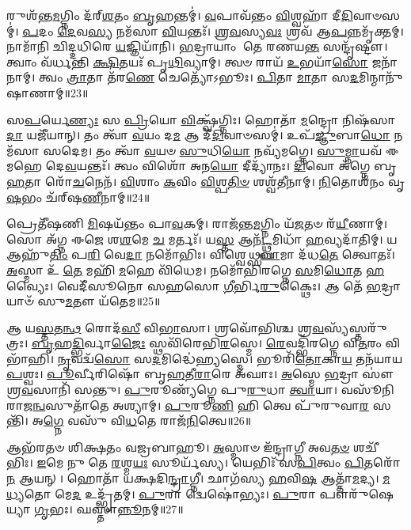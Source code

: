 𑌰𑍁𑌶᳴𑌨𑍍𑌤\-\ul{𑌮}\-𑌗𑍍𑌨𑌿𑌂 𑌦᳴𑌰𑍍‌\mbox{}\-\ul{𑌶}\-𑌤𑌂 \ul{𑌬𑍃}\-𑌹𑌨𑍍𑌤𑌮𑍍॑।
\-\ul{𑌵}\-𑌪𑌾𑌵᳴𑌨𑍍𑌤𑌂 \ul{𑌵𑌿}\-𑌶𑍍𑌵𑌹𑌾᳴ 𑌦𑍀\-\ul{𑌦𑌿}\-𑌵𑌾𑍞𑌸𑌮𑍍॑।
\-\ul{𑌪}\-𑌦𑌂 \ul{𑌦𑍇}\-𑌵\-\ul{𑌸𑍍𑌯} 𑌨𑌮᳴𑌸𑌾 \ul{𑌵𑌿}\-𑌯𑌨𑍍𑌤𑌃᳴।
\-\ul{𑌶𑍍𑌰}\-\-\ul{𑌵}\-𑌸𑍍𑌯\-\ul{𑌵𑌃} 𑌶𑍍𑌰𑌵᳴ 𑌆\-\ul{𑌪}\-𑌨𑍍𑌨𑌮𑍃᳴𑌕𑍍𑌤𑌮𑍍।
𑌨𑌾𑌮𑌾᳴𑌨𑌿 𑌚𑌿𑌦𑍍𑌦𑌧𑌿𑌰𑍇 \ul{𑌯}\-𑌜𑍍𑌞𑌿𑌯𑌾᳴𑌨𑌿।
\-\ul{𑌭}\-𑌦𑍍𑌰𑌾𑌯𑌾𑌂 𑌤𑍇 𑌰𑌣𑌯\-\ul{𑌨𑍍𑌤} 𑌸𑌨𑍍𑌦𑍃᳴𑌷𑍍𑌟𑍗।
𑌤𑍍𑌵𑌾𑌂 𑌵᳴𑌰𑍍𑌧𑌨𑍍𑌤𑌿 \ul{𑌕𑍍𑌷𑌿}\-𑌤𑌯𑌃᳴ 𑌪𑍃\-\ul{𑌥𑌿}\-𑌵𑍍𑌯𑌾𑌮𑍍।
𑌤𑍍𑌵𑍞 𑌰𑌾𑌯᳴ \ul{𑌉}\-𑌭𑌯𑌾᳴\-\ul{𑌸𑍋} 𑌜𑌨𑌾᳴𑌨𑌾𑌮𑍍।
𑌤𑍍𑌵𑌂 \ul{𑌤𑍍𑌰𑌾}\-𑌤𑌾 𑌤᳴𑌰\-\ul{𑌣𑍇} 𑌚𑍇𑌤𑍍𑌯𑍋᳴𑌽𑌭𑍂𑌃।
\-\ul{𑌪𑌿}\-𑌤𑌾 \ul{𑌮𑌾}\-𑌤𑌾 𑌸\-\ul{𑌦}\-𑌮𑌿𑌨𑍍𑌮𑌾𑌨𑍁᳴𑌷𑌾𑌣𑌾𑌮𑍍॥23॥

𑌸\-\ul{𑌪}\-𑌰𑍍𑌯𑍇\-\ul{𑌣𑍍𑌯𑌃} 𑌸 \ul{𑌪𑍍𑌰𑌿}\-𑌯𑍋 \ul{𑌵𑌿}\-𑌕𑍍𑌷𑍍𑌵᳴𑌗𑍍𑌨𑌿𑌃।
𑌹𑍋𑌤𑌾᳴ \ul{𑌮}\-𑌨𑍍𑌦𑍍𑌰𑍋 𑌨𑌿𑌷᳴𑌸𑌾\-\ul{𑌦𑌾} 𑌯𑌜𑍀᳴𑌯𑌾𑌨𑍍।
𑌤𑌂 𑌤𑍍𑌵𑌾᳴ \ul{𑌵}\-𑌯𑌂 𑌦\-\ul{𑌮} 𑌆 𑌦𑍀᳴\-\ul{𑌦𑌿}\-𑌵𑌾𑍞𑌸𑌮𑍍॑।
𑌉𑌪᳴\-\ul{𑌜𑍍𑌞𑍁}\-𑌬𑌾\-\ul{𑌧𑍋} 𑌨𑌮᳴𑌸𑌾 𑌸𑌦𑍇𑌮।
𑌤𑌂 𑌤𑍍𑌵𑌾᳴ \ul{𑌵}\-𑌯𑍞 \ul{𑌸𑍁}\-𑌧𑌿\-\ul{𑌯𑍋} 𑌨𑌵𑍍𑌯᳴𑌮𑌗𑍍𑌨𑍇।
\-\ul{𑌸𑍁}\-\-\ul{𑌮𑍍𑌨𑌾}\-𑌯𑌵᳴ 𑌈𑌮𑌹𑍇 𑌦𑍇\-\ul{𑌵}\-𑌯𑌨𑍍𑌤𑌃᳴।
𑌤𑍍𑌵𑌂 𑌵𑌿𑌶𑍋᳴ 𑌅𑌨\-\ul{𑌯𑍋} 𑌦𑍀𑌦𑍍𑌯𑌾᳴𑌨𑌃।
\-\ul{𑌦𑌿}\-𑌵𑍋 𑌅᳴𑌗𑍍𑌨𑍇 𑌬𑍃\-\ul{𑌹}\-𑌤𑌾 𑌰𑍋᳴\-\ul{𑌚}\-𑌨𑍇𑌨᳴।
\-\ul{𑌵𑌿}\-𑌶𑌾𑌂 \ul{𑌕}\-𑌵𑌿𑌂 \ul{𑌵𑌿}\-𑌶𑍍𑌪\-\ul{𑌤𑌿}\-\-\ul{𑍞} 𑌶𑌶𑍍𑌵᳴𑌤𑍀𑌨𑌾𑌮𑍍।
\-\ul{𑌨𑌿}\-𑌤𑍋𑌶᳴𑌨𑌂 𑌵𑍃\-\ul{𑌷}\-𑌭𑌂 𑌚᳴𑌰𑍍‌\mbox{}𑌷\-\ul{𑌣𑍀}\-𑌨𑌾𑌮𑍍॥24॥

𑌪𑍍𑌰𑍇𑌤𑍀᳴𑌷𑌣𑌿 \ul{𑌮𑌿}\-𑌷𑌯᳴𑌨𑍍𑌤𑌂 𑌪𑌾\-\ul{𑌵}\-𑌕𑌮𑍍।
𑌰𑌾𑌜᳴𑌨𑍍𑌤\-\ul{𑌮}\-𑌗𑍍𑌨𑌿𑌂 𑌯᳴\-\ul{𑌜}\-𑌤𑍞 𑌰᳴\-\ul{𑌯𑍀}\-𑌣𑌾𑌮𑍍।
𑌸𑍋 𑌅᳴𑌗𑍍𑌨 𑌈𑌜𑍇 𑌶\-\ul{𑌶}\-𑌮𑍇 \ul{𑌚} 𑌮𑌰𑍍𑌤𑌃᳴।
𑌯\-\ul{𑌸𑍍𑌤} 𑌆𑌨᳴\-\ul{𑌟𑍍𑌥𑍍𑌸}\-𑌮𑌿𑌧𑌾᳴ \ul{𑌹}\-𑌵𑍍𑌯𑌦𑌾᳴𑌤𑌿𑌮𑍍।
𑌯 𑌆𑌹𑍁᳴\-\ul{𑌤𑌿𑌂} 𑌪\-\ul{𑌰𑌿} 𑌵𑍇\-\ul{𑌦𑌾} 𑌨𑌮𑍋᳴𑌭𑌿𑌃।
𑌵𑌿𑌶𑍍𑌵𑍇𑌥𑍍𑌸\-\ul{𑌵𑌾}\-𑌮𑌾 𑌦᳴𑌧\-\ul{𑌤𑍇} 𑌤𑍍𑌵𑍋𑌤𑌃᳴।
\-\ul{𑌅}\-𑌸𑍍𑌮𑌾 𑌉᳴ \ul{𑌤𑍇} 𑌮𑌹𑌿᳴ \ul{𑌮}\-𑌹𑍇 𑌵𑌿᳴𑌧𑍇𑌮।
𑌨𑌮𑍋᳴𑌭𑌿𑌰𑌗𑍍𑌨𑍇 \ul{𑌸}\-𑌮𑌿\-\ul{𑌧𑍋}\-𑌤 \ul{𑌹}\-𑌵𑍍𑌯𑍈𑌃।
𑌵𑍇𑌦𑍀᳴𑌸𑍂𑌨𑍋 𑌸𑌹𑌸𑍋 \ul{𑌗𑍀}\-𑌰𑍍𑌭𑌿\-\ul{𑌰𑍁}\-𑌕𑍍𑌥𑍈𑌃।
𑌆 𑌤𑍇᳴ \ul{𑌭}\-𑌦𑍍𑌰𑌾𑌯𑌾𑍞᳴ 𑌸𑍁\-\ul{𑌮}\-𑌤𑍗 𑌯᳴𑌤𑍇𑌮॥25॥

𑌆 𑌯\-\ul{𑌸𑍍𑌤}\-𑌤\-\ul{𑌨𑍍𑌥} 𑌰𑍋𑌦᳴\-\ul{𑌸𑍀} 𑌵𑌿\-\ul{𑌭𑌾}\-𑌸𑌾।
𑌶𑍍𑌰𑌵𑍋᳴𑌭𑌿𑌶𑍍𑌚 𑌶𑍍𑌰\-\ul{𑌵}\-𑌸𑍍𑌯᳴𑌸𑍍𑌤𑌰𑍁᳴𑌤𑍍𑌰𑌃।
\-\ul{𑌬𑍃}\-𑌹\-\ul{𑌦𑍍𑌭𑌿}\-𑌰𑍍𑌵𑌾\-\ul{𑌜𑍈𑌃} 𑌸𑍍𑌥𑌵𑌿᳴𑌰𑍇𑌭𑌿\-\ul{𑌰}\-𑌸𑍍𑌮𑍇।
\-\ul{𑌰𑍇}\-𑌵𑌦𑍍𑌭𑌿᳴𑌰𑌗𑍍𑌨𑍇 𑌵𑌿\-\ul{𑌤}\-𑌰𑌂 𑌵𑌿 𑌭𑌾᳴𑌹𑌿।
\-\ul{𑌨𑍃}\-𑌵𑌦𑍍𑌵᳴\-\ul{𑌸𑍋} 𑌸\-\ul{𑌦}\-𑌮𑌿𑌦𑍍𑌧𑍇॑\-\ul{𑌹𑍍𑌯}\-𑌸𑍍𑌮𑍇।
𑌭𑍂𑌰𑌿᳴\-\ul{𑌤𑍋}\-𑌕𑌾\-\ul{𑌯} 𑌤𑌨᳴𑌯𑌾𑌯 \ul{𑌪}\-𑌶𑍍𑌵𑌃।
\-\ul{𑌪𑍂}\-𑌰𑍍𑌵𑍀𑌰𑌿𑌷𑍋᳴ 𑌬𑍃\-\ul{𑌹}\-𑌤𑍀\-\ul{𑌰𑌾}\-𑌰𑍇 𑌅᳴𑌘𑌾𑌃।
\-\ul{𑌅}\-𑌸𑍍𑌮𑍇 \ul{𑌭}\-𑌦𑍍𑌰𑌾 𑌸𑍗॑𑌶𑍍𑌰\-\ul{𑌵}\-𑌸𑌾𑌨𑌿᳴ 𑌸𑌨𑍍𑌤𑍁।
\-\ul{𑌪𑍁}\-𑌰𑍂𑌣𑍍𑌯᳴𑌗𑍍𑌨𑍇 𑌪𑍁\-\ul{𑌰𑍁}\-𑌧𑌾 \ul{𑌤𑍍𑌵𑌾}\-𑌯𑌾।
𑌵𑌸𑍂᳴𑌨𑌿 𑌰𑌾𑌜\-\ul{𑌨𑍍𑌵}\-𑌸𑍁𑌤𑌾᳴𑌤𑍇 𑌅𑌶𑍍𑌯𑌾𑌮𑍍।
\-\ul{𑌪𑍁}\-𑌰𑍂\-\ul{𑌣𑌿} 𑌹𑌿 𑌤𑍍𑌵𑍇 𑌪𑍁᳴𑌰𑍁𑌵𑌾\-\ul{𑌰} 𑌸𑌨𑍍𑌤𑌿᳴।
𑌅\-\ul{𑌗𑍍𑌨𑍇} 𑌵𑌸𑍁᳴ 𑌵𑌿\-\ul{𑌧}\-𑌤𑍇 𑌰𑌾𑌜᳴\-\ul{𑌨𑌿}\-𑌤𑍍𑌵𑍇॥26॥\anuvakamend[\-\ul{𑌜𑌾}\-\-\ul{𑌗𑍃}\-𑌵𑌾𑍞\-\ul{𑌸𑍋} 𑌅𑌨𑍁᳴\-\ul{𑌗𑍍𑌮}\-𑌨𑍍𑌮𑌾𑌨𑍁᳴𑌷𑌾𑌣𑌾𑌞𑍍𑌚𑌰𑍍‌\mbox{}𑌷\-\ul{𑌣𑍀}\-𑌨𑌾𑌂 𑌯᳴𑌤𑍇𑌮𑌾\-\ul{𑌶𑍍𑌯𑌾}\-𑌨𑍍𑌦𑍍𑌵𑍇 𑌚᳴]

𑌆𑌭᳴𑌰𑌤𑍞 𑌶𑌿𑌕𑍍𑌷𑌤𑌂 𑌵𑌜𑍍𑌰𑌬𑌾𑌹𑍂।
\-\ul{𑌅}\-𑌸𑍍𑌮𑌾𑍞 𑌇᳴𑌨𑍍𑌦𑍍𑌰𑌾𑌗𑍍𑌨𑍀 𑌅𑌵\-\ul{𑌤}\-\-\ul{𑍞} 𑌶𑌚𑍀᳴𑌭𑌿𑌃।
\-\ul{𑌇}\-𑌮𑍇 𑌨𑍁 𑌤𑍇 \ul{𑌰}\-𑌶𑍍𑌮\-\ul{𑌯𑌃} 𑌸𑍂𑌰𑍍𑌯᳴𑌸𑍍𑌯।
𑌯𑍇𑌭𑌿𑌃᳴ 𑌸\-\ul{𑌪𑌿}\-𑌤𑍍𑌵𑌂 \ul{𑌪𑌿}\-𑌤𑌰𑍋᳴ \ul{𑌨} 𑌆𑌯𑌨𑍍।
𑌹𑍋𑌤𑌾᳴ 𑌯𑌕𑍍𑌷𑌦𑌿\-\ul{𑌨𑍍𑌦𑍍𑌰𑌾}\-𑌗𑍍𑌨𑍀।
𑌛𑌾𑌗᳴𑌸𑍍𑌯 \ul{𑌹}\-𑌵𑌿\-\ul{𑌷} 𑌆𑌤𑍍𑌤𑌾᳴\-\ul{𑌮}\-𑌦𑍍𑌯।
\-\ul{𑌮}\-\-\ul{𑌧𑍍𑌯}\-𑌤𑍋 𑌮𑍇\-\ul{𑌦} 𑌉𑌦𑍍𑌭𑍃᳴𑌤𑌮𑍍।
\-\ul{𑌪𑍁}\-𑌰𑌾 𑌦𑍍𑌵𑍇𑌷𑍋॑𑌭𑍍𑌯𑌃।
\-\ul{𑌪𑍁}\-𑌰𑌾 𑌪𑍗𑌰𑍁᳴𑌷𑍇𑌯𑍍𑌯𑌾 \ul{𑌗𑍃}\-𑌭𑌃।
𑌘𑌸𑍍𑌤𑌾॑\-\ul{𑌨𑍍𑌨𑍂}\-𑌨𑌮𑍍॥27॥

